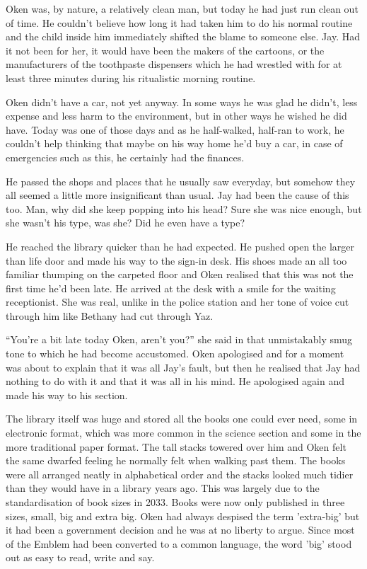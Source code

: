 Oken was, by nature, a relatively clean man, but today he had just run clean out of time.  He couldn't believe how long it had taken him to do his normal routine and the child inside him immediately shifted the blame to someone else.  Jay.  Had it not been for her, it would have been the makers of the cartoons, or the manufacturers of the toothpaste dispensers which he had wrestled with for at least three minutes during his ritualistic morning routine.

Oken didn't have a car, not yet anyway.  In some ways he was glad he didn't, less expense and less harm to the environment, but in other ways he wished he did have.  Today was one of those days and as he half-walked, half-ran to work, he couldn't help thinking that maybe on his way home he'd buy a car, in case of emergencies such as this, he certainly had the finances.

He passed the shops and places that he usually saw everyday, but somehow they all seemed a little more insignificant than usual.  Jay had been the cause of this too.  Man, why did she keep popping into his head?  Sure she was nice enough, but she wasn't his type, was she?  Did he even have a type?



\thoughtbreak



He reached the library quicker than he had expected.  He pushed open the larger than life door and made his way to the sign-in desk.  His shoes made an all too familiar thumping on the carpeted floor and Oken realised that this was not the first time he'd been late.  He arrived at the desk with a smile for the waiting receptionist.  She was real, unlike in the police station and her tone of voice cut through him like Bethany had cut through Yaz.

``You're a bit late today Oken, aren't you?'' she said in that unmistakably smug tone to which he had become accustomed.  Oken apologised and for a moment was about to explain that it was all Jay's fault, but then he realised that Jay had nothing to do with it and that it was all in his mind.  He apologised again and made his way to his section.

The library itself was huge and stored all the books one could ever need, some in electronic format, which was more common in the science section and some in the more traditional paper format.  The tall stacks towered over him and Oken felt the same dwarfed feeling he normally felt when walking past them.  The books were all arranged neatly in alphabetical order and the stacks looked much tidier than they would have in a library years ago.  This was largely due to the standardisation of book sizes in 2033.  Books were now only published in three sizes, small, big and extra big.  Oken had always despised the term 'extra-big' but it had been a government decision and he was at no liberty to argue.  Since most of the Emblem had been converted to a common language, the word 'big' stood out as easy to read, write and say.  

